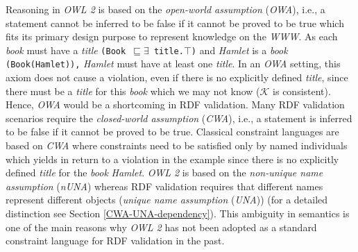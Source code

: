 \documentclass{acm_proc_article-sp}
\newcommand{\ms}[1]{%
  \texttt{#1}
}
\newcommand{\tb}[1]{\todo[size=\small, color=green!40]{\textbf{Thomas:} #1}}
\begin{document}
Reasoning in \emph{OWL 2} is based on the {\em open-world assumption} (\emph{OWA}), i.e., a statement cannot be inferred to be false if it cannot be proved to be true  which fits its primary design purpose to represent knowledge on the \emph{WWW}. 
As each \emph{book} must have a \emph{title} {\small\ms{(Book $\sqsubseteq \exists$ title.$\top$)}} and {\em Hamlet} is a \emph{book} {\small\ms{(Book(Hamlet)),}}
{\em Hamlet} must have at least one \emph{title}.
In an \emph{OWA} setting, this axiom does not cause a violation, even if there is no explicitly defined \emph{title}, since there must be a \emph{title} for this \emph{book} which we may not know ($\mathcal{K}$ is consistent).
Hence, \emph{OWA} would be a shortcoming in RDF validation.  
Many RDF validation scenarios require the {\em closed-world assumption} (\emph{CWA}), i.e., a statement is inferred to be false if it cannot be proved to be true.
Classical constraint languages are based on \emph{CWA} where constraints need to be satisfied only by named individuals 
which yields in return to a violation in the example since there is no explicitly defined \emph{title} for the \emph{book} {\em Hamlet}. 
\emph{OWL 2} is based on the {\em non-unique name assumption} (\emph{nUNA}) whereas RDF validation requires that different names represent different objects ({\em unique name assumption} (\emph{UNA})) (for a detailed distinction see Section \ref{CWA-UNA-dependency}). 
This ambiguity in semantics is one of the main reasons why \emph{OWL 2} has not been adopted as a standard constraint language for RDF validation in the past.
  
\end{document}
